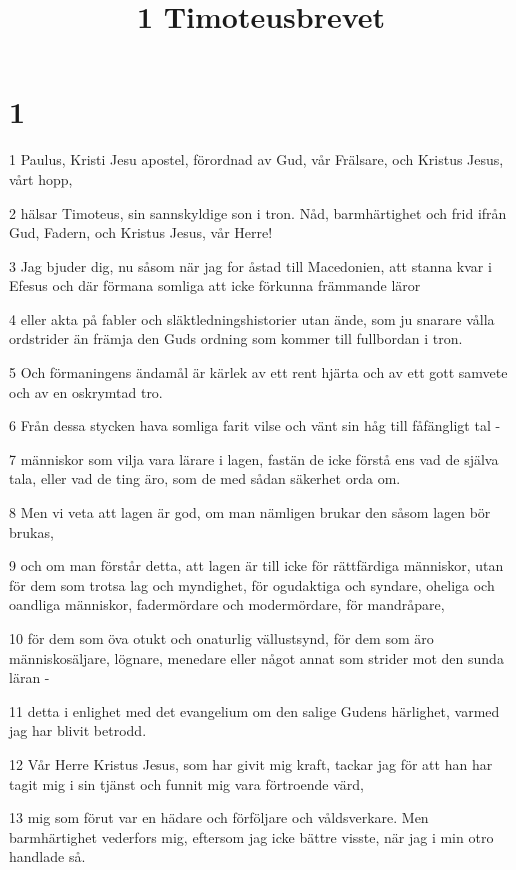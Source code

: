 

\title{1 Timoteusbrevet}


\chapter{1}

\par 1 Paulus, Kristi Jesu apostel, förordnad av Gud, vår Frälsare, och Kristus Jesus, vårt hopp,
\par 2 hälsar Timoteus, sin sannskyldige son i tron. Nåd, barmhärtighet och frid ifrån Gud, Fadern, och Kristus Jesus, vår Herre!
\par 3 Jag bjuder dig, nu såsom när jag for åstad till Macedonien, att stanna kvar i Efesus och där förmana somliga att icke förkunna främmande läror
\par 4 eller akta på fabler och släktledningshistorier utan ände, som ju snarare vålla ordstrider än främja den Guds ordning som kommer till fullbordan i tron.
\par 5 Och förmaningens ändamål är kärlek av ett rent hjärta och av ett gott samvete och av en oskrymtad tro.
\par 6 Från dessa stycken hava somliga farit vilse och vänt sin håg till fåfängligt tal -
\par 7 människor som vilja vara lärare i lagen, fastän de icke förstå ens vad de själva tala, eller vad de ting äro, som de med sådan säkerhet orda om.
\par 8 Men vi veta att lagen är god, om man nämligen brukar den såsom lagen bör brukas,
\par 9 och om man förstår detta, att lagen är till icke för rättfärdiga människor, utan för dem som trotsa lag och myndighet, för ogudaktiga och syndare, oheliga och oandliga människor, fadermördare och modermördare, för mandråpare,
\par 10 för dem som öva otukt och onaturlig vällustsynd, för dem som äro människosäljare, lögnare, menedare eller något annat som strider mot den sunda läran -
\par 11 detta i enlighet med det evangelium om den salige Gudens härlighet, varmed jag har blivit betrodd.
\par 12 Vår Herre Kristus Jesus, som har givit mig kraft, tackar jag för att han har tagit mig i sin tjänst och funnit mig vara förtroende värd,
\par 13 mig som förut var en hädare och förföljare och våldsverkare. Men barmhärtighet vederfors mig, eftersom jag icke bättre visste, när jag i min otro handlade så.
